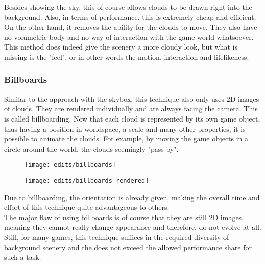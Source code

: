 \noindent
Besides showing the sky, this of course allows clouds to be drawn right into the background. Also, in terms of performance, this is extremely cheap and efficient. On the other hand, it removes the ability for the clouds to move. They also have no volumetric body and no way of interaction with the game world whatsoever.
\\
This method does indeed give the scenery a more cloudy look, but what is missing is the "feel", or in other words the motion, interaction and lifelikeness.

\subsubsection{Billboards}
Similar to the approach with the skybox, this technique also only uses 2D images of clouds. They are rendered individually and are always facing the camera. This is called \gls{billboard}ing.
Now that each cloud is represented by its own game object, thus having a position in \gls{worldspace}, a scale and many other properties, it is possible to animate the clouds. For example, by moving the game objects in a circle around the world, the clouds seemingly "pass by".
\begin{figure}[H]
    \centering
        \begin{minipage}{0.48\linewidth}
            \texttt{[image: edits/billboards]}
            \label{img:edits:billboards}
        \end{minipage}
    \hfill
        \begin{minipage}{0.45\linewidth}
            \texttt{[image: edits/billboards\_rendered]}
            \label{img:edits:billboards_rendered}
        \end{minipage}
\end{figure}
\noindent
Due to billboarding, the orientation is already given, making the overall time and effort of this technique quite advantageous to others.
\\
The major flaw of using billboards is of course that they are still 2D images, meaning they cannot really change appearance and therefore, do not evolve at all. 
Still, for many games, this technique suffices in the required diversity of background scenery and the does not exceed the allowed performance share for such a task.


